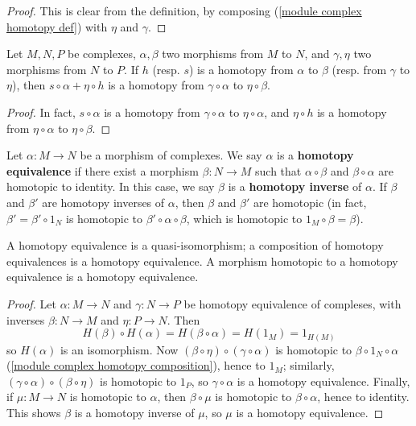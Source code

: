 \begin{proof}
This is clear from the definition, by composing (\ref{module complex homotopy def}) with $\eta$ and $\gamma$.
\end{proof}
\begin{corollary}\label{module complex homotopy composition two step}
Let $M,N,P$ be complexes, $\alpha,\beta$ two morphisms from $M$ to $N$, and $\gamma,\eta$ two morphisms from $N$ to $P$. If $h$ (resp. $s$) is a homotopy from $\alpha$ to $\beta$ (resp. from $\gamma$ to $\eta$), then $s\circ\alpha+\eta\circ h$ is a homotopy from $\gamma\circ\alpha$ to $\eta\circ\beta$. 
\end{corollary}
\begin{proof}
In fact, $s\circ\alpha$ is a homotopy from $\gamma\circ\alpha$ to $\eta\circ\alpha$, and $\eta\circ h$ is a homotopy from $\eta\circ\alpha$ to $\eta\circ\beta$.
\end{proof}
Let $\alpha:M\to N$ be a morphism of complexes. We say $\alpha$ is a \textbf{homotopy equivalence} if there exist a morphism $\beta:N\to M$ such that $\alpha\circ\beta$ and $\beta\circ\alpha$ are homotopic to identity. In this case, we say $\beta$ is a \textbf{homotopy inverse} of $\alpha$. If $\beta$ and $\beta'$ are homotopy inverses of $\alpha$, then $\beta$ and $\beta'$ are homotopic (in fact, $\beta'=\beta'\circ 1_N$ is homotopic to $\beta'\circ\alpha\circ\beta$, which is homotopic to $1_M\circ\beta=\beta$).
\begin{proposition}\label{module complex homotopy equivalence prop}
A homotopy equivalence is a quasi-isomorphism; a composition of homotopy equivalences is a homotopy equivalence. A morphism homotopic to a homotopy equivalence is a homotopy equivalence.
\end{proposition}
\begin{proof}
Let $\alpha:M\to N$ and $\gamma:N\to P$ be homotopy equivalence of compleses, with inverses $\beta:N\to M$ and $\eta:P\to N$. Then
\[H(\beta)\circ H(\alpha)=H(\beta\circ\alpha)=H(1_M)=1_{H(M)}\]
so $H(\alpha)$ is an isomorphism. Now $(\beta\circ\eta)\circ(\gamma\circ\alpha)$ is homotopic to $\beta\circ 1_{N}\circ\alpha$ (\cref{module complex homotopy composition}), hence to $1_M$; similarly, $(\gamma\circ\alpha)\circ(\beta\circ\eta)$ is homotopic to $1_P$, so $\gamma\circ\alpha$ is a homotopy equivalence. Finally, if $\mu:M\to N$ is homotopic to $\alpha$, then $\beta\circ\mu$ is homotopic to $\beta\circ\alpha$, hence to identity. This shows $\beta$ is a homotopy inverse of $\mu$, so $\mu$ is a homotopy equivalence.
\end{proof}
